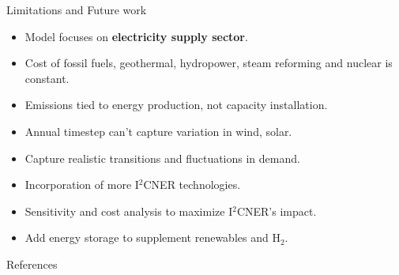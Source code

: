 \documentclass[final]{beamer}
\newlength{\onecolwid}
\newlength{\threecolwid}
\begin{document}
\begin{frame}[t]
\begin{columns}[t,totalwidth=\threecolwid]
\begin{column}{\onecolwid}
\begin{block}{Limitations and Future work}
    \begin{itemize}
    
    \item Model focuses on \textbf{electricity supply sector}.
    
    \item Cost of fossil fuels, geothermal, hydropower, steam reforming and nuclear is constant.
        
    \item Emissions tied to energy production, not capacity installation.
    
    \item Annual timestep can't capture variation in wind, solar.    
    
    \item Capture realistic transitions and fluctuations in demand.
    
    \item Incorporation of more I$^2$CNER technologies.
    
    \item Sensitivity and cost analysis to maximize I$^2$CNER's impact.
    
    
    \item Add energy storage to supplement renewables and H$_2$. 
    
    \end{itemize}
\end{block}

\begin{block}{References}
        {\footnotesize 
        }
\end{block}





\end{column}
\end{columns}
\end{frame}
\end{document}
